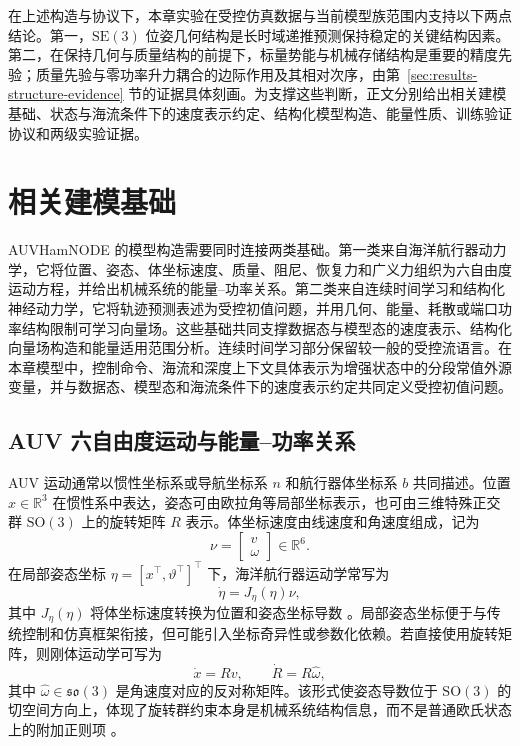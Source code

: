 \documentclass[UTF8,zihao=-4]{ctexrep}
\newcommand{\R}{\mathbb{R}}
\newcommand{\SO}{\mathrm{SO}}
\newcommand{\SE}{\mathrm{SE}}
\begin{document}
在上述构造与协议下，本章实验在受控仿真数据与当前模型族范围内支持以下两点结论。第一，\(\SE(3)\) 位姿几何结构是长时域递推预测保持稳定的关键结构因素。第二，在保持几何与质量结构的前提下，标量势能与机械存储结构是重要的精度先验；质量先验与零功率升力耦合的边际作用及其相对次序，由第~\ref{sec:results-structure-evidence} 节的证据具体刻画。为支撑这些判断，正文分别给出相关建模基础、状态与海流条件下的速度表示约定、结构化模型构造、能量性质、训练验证协议和两级实验证据。

\section{相关建模基础}
\label{sec:modeling-prelim}

AUVHamNODE 的模型构造需要同时连接两类基础。第一类来自海洋航行器动力学，它将位置、姿态、体坐标速度、质量、阻尼、恢复力和广义力组织为六自由度运动方程，并给出机械系统的能量--功率关系。第二类来自连续时间学习和结构化神经动力学，它将轨迹预测表述为受控初值问题，并用几何、能量、耗散或端口功率结构限制可学习向量场。这些基础共同支撑数据态与模型态的速度表示、结构化向量场构造和能量适用范围分析。连续时间学习部分保留较一般的受控流语言。在本章模型中，控制命令、海流和深度上下文具体表示为增强状态中的分段常值外源变量，并与数据态、模型态和海流条件下的速度表示约定共同定义受控初值问题。

\subsection{AUV 六自由度运动与能量--功率关系}

AUV 运动通常以惯性坐标系或导航坐标系 \(n\) 和航行器体坐标系 \(b\) 共同描述。位置 \(x\in\R^3\) 在惯性系中表达，姿态可由欧拉角等局部坐标表示，也可由三维特殊正交群 \(\SO(3)\) 上的旋转矩阵 \(R\) 表示。体坐标速度由线速度和角速度组成，记为
\begin{equation}
  \nu=\begin{bmatrix}v\\\omega\end{bmatrix}\in\R^6 .
  \label{eq:body-velocity-prelim}
\end{equation}
在局部姿态坐标 \(\eta=[x^\top,\vartheta^\top]^\top\) 下，海洋航行器运动学常写为
\begin{equation}
  \dot\eta=J_\eta(\eta)\nu ,
  \label{eq:eta-kinematics-prelim}
\end{equation}
其中 \(J_\eta(\eta)\) 将体坐标速度转换为位置和姿态坐标导数 \citep{fossen2011handbook,fossen2021handbook}。局部姿态坐标便于与传统控制和仿真框架衔接，但可能引入坐标奇异性或参数化依赖。若直接使用旋转矩阵，则刚体运动学可写为
\begin{equation}
  \dot x=Rv,\qquad
  \dot R=R\widehat{\omega},
  \label{eq:se3-prelim-kinematics}
\end{equation}
其中 \(\widehat{\omega}\in\mathfrak{so}(3)\) 是角速度对应的反对称矩阵。该形式使姿态导数位于 \(\SO(3)\) 的切空间方向上，体现了旋转群约束本身是机械系统结构信息，而不是普通欧氏状态上的附加正则项 \citep{bullo2004geometric,hairer2006geometric}。
\end{document}
